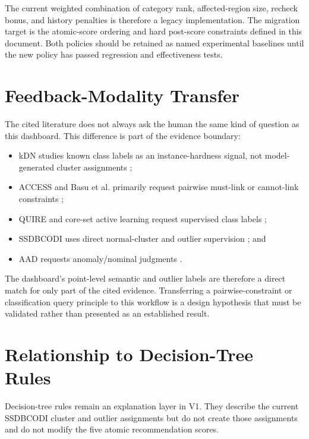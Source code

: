 \documentclass[11pt]{article}
\begin{document}
The current weighted combination of category rank, affected-region size,
recheck bonus, and history penalties is therefore a legacy implementation. The
migration target is the atomic-score ordering and hard post-score constraints
defined in this document. Both policies should be retained as named experimental
baselines until the new policy has passed regression and effectiveness tests.

\section{Feedback-Modality Transfer}

The cited literature does not always ask the human the same kind of question as
this dashboard. This difference is part of the evidence boundary:
\begin{itemize}[leftmargin=*]
    \item kDN studies known class labels as an instance-hardness signal, not
    model-generated cluster assignments \cite{smith2014instance};
    \item ACCESS and Basu et al. primarily request pairwise must-link or
    cannot-link constraints \cite{xu2005access,basu2004active};
    \item QUIRE and core-set active learning request supervised class labels
    \cite{huang2014quire,sener2018coreset};
    \item SSDBCODI uses direct normal-cluster and outlier supervision
    \cite{deng2022ssdbcodi}; and
    \item AAD requests anomaly/nominal judgments \cite{das2016aad}.
\end{itemize}

The dashboard's point-level semantic and outlier labels are therefore a direct
match for only part of the cited evidence. Transferring a pairwise-constraint or
classification query principle to this workflow is a design hypothesis that
must be validated rather than presented as an established result.

\section{Relationship to Decision-Tree Rules}

Decision-tree rules remain an explanation layer in V1. They describe the
current SSDBCODI cluster and outlier assignments but do not create those
assignments and do not modify the five atomic recommendation scores.
\end{document}
